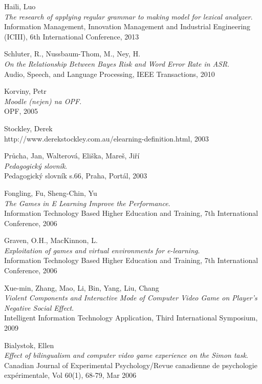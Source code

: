 \begin{thebibliography}{99}
  {\sc Haili,} Luo\\
  \emph{The research of applying regular grammar to making model for lexical analyzer}.\\
  Information Management, Innovation Management and Industrial Engineering (ICIII), 6th International Conference, 2013
  
  {\sc Schluter,} R., {\sc Nussbaum-Thom,} M., {\sc Ney,} H.\\
  \emph{On the Relationship Between Bayes Risk and Word Error Rate in ASR}.\\
  Audio, Speech, and Language Processing, IEEE Transactions, 2010

  {\sc Korviny,} Petr\\
  \emph{Moodle (nejen) na OPF}.\\
  OPF, 2005

  {\sc Stockley,} Derek\\
  http://www.derekstockley.com.au/elearning-definition.html, 2003

  {\sc Průcha,} Jan, {\sc Walterová,} Eliška, {\sc Mareš,} Jiří\\
  \emph{Pedagogický slovník}.\\
  Pedagogický slovník s.66, Praha, Portál, 2003

  {\sc Fongling,} Fu, {\sc Sheng-Chin,} Yu\\
  \emph{The Games in E Learning Improve the Performance}.\\
  Information Technology Based Higher Education and Training, 7th International Conference, 2006

  {\sc Graven,} O.H., {\sc MacKinnon,} L.\\
  \emph{Exploitation of games and virtual environments for e-learning}.\\
  Information Technology Based Higher Education and Training, 7th International Conference, 2006

  {\sc Xue-min,} Zhang, {\sc Mao,} Li, {\sc Bin,} Yang, {\sc Liu,} Chang\\
  \emph{Violent Components and Interactive Mode of Computer Video Game on Player's Negative Social Effect}.\\
  Intelligent Information Technology Application, Third International Symposium, 2009

  {\sc Bialystok,} Ellen\\
  \emph{Effect of bilingualism and computer video game experience on the Simon task}.\\
  Canadian Journal of Experimental Psychology/Revue canadienne de psychologie expérimentale, Vol 60(1), 68-79, Mar 2006
  

\end{thebibliography}
